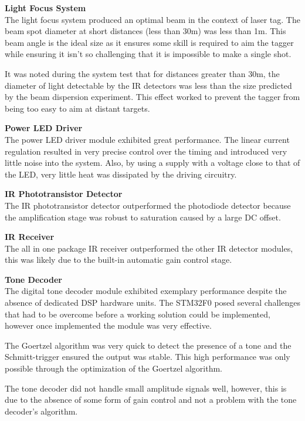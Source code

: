 \textbf{Light Focus System}\\
The light focus system produced an optimal beam in the context of laser tag. The beam spot diameter at short distances (less than 30m) was less than 1m. This beam angle is the ideal size as it ensures some skill is required to aim the tagger while ensuring it isn't so challenging that it is impossible to make a single shot.

It was noted during the system test that for distances greater than 30m, the diameter of light detectable by the IR detectors was less than the size predicted by the beam dispersion experiment. This effect worked to prevent the tagger from being too easy to aim at distant targets.

\textbf{Power LED Driver}\\
The power LED driver module exhibited great performance. The linear current regulation resulted in very precise control over the timing and introduced very little noise into the system. Also, by using a supply with a voltage close to that of the LED, very little heat was dissipated by the driving circuitry.

\textbf{IR Phototransistor Detector}\\
The IR phototransistor detector outperformed the photodiode detector because the amplification stage was robust to saturation caused by a large DC offset.

\textbf{IR Receiver}\\
The all in one package IR receiver outperformed the other IR detector modules, this was likely due to the built-in automatic gain control stage.

\textbf{Tone Decoder}\\ %
The digital tone decoder module exhibited exemplary performance despite the absence of dedicated DSP hardware units. The STM32F0 posed several challenges that had to be overcome before a working solution could be implemented, however once implemented the module was very effective.

The Goertzel algorithm was very quick to detect the presence of a tone and the Schmitt-trigger ensured the output was stable. This high performance was only possible through the optimization of the Goertzel algorithm.

The tone decoder did not handle small amplitude signals well, however, this is due to the absence of some form of gain control and not a problem with the tone decoder's algorithm.

